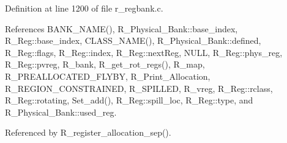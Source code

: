 Definition at line 1200 of file r\_\-regbank.c.

References BANK\_\-NAME(), R\_\-Physical\_\-Bank::base\_\-index, R\_\-Reg::base\_\-index, CLASS\_\-NAME(), R\_\-Physical\_\-Bank::defined, R\_\-Reg::flags, R\_\-Reg::index, R\_\-Reg::next\-Reg, NULL, R\_\-Reg::phys\_\-reg, R\_\-Reg::pvreg, R\_\-bank, R\_\-get\_\-rot\_\-regs(), R\_\-map, R\_\-PREALLOCATED\_\-FLYBY, R\_\-Print\_\-Allocation, R\_\-REGION\_\-CONSTRAINED, R\_\-SPILLED, R\_\-vreg, R\_\-Reg::rclass, R\_\-Reg::rotating, Set\_\-add(), R\_\-Reg::spill\_\-loc, R\_\-Reg::type, and R\_\-Physical\_\-Bank::used\_\-reg.

Referenced by R\_\-register\_\-allocation\_\-sep().